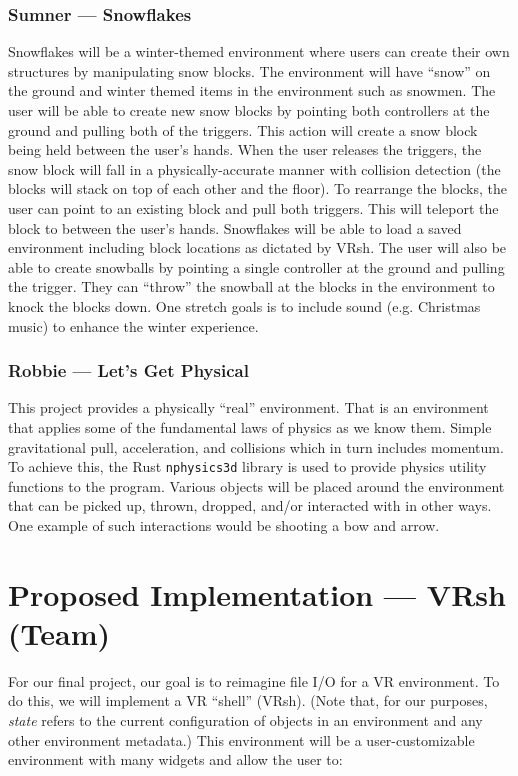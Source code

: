 \documentclass[titlepage,12pt]{article}
\begin{document}
\subsubsection{Sumner --- Snowflakes}
Snowflakes will be a winter-themed environment where users can create their own
structures by manipulating snow blocks. The environment will have ``snow'' on
the ground and winter themed items in the environment such as snowmen. The user
will be able to create new snow blocks by pointing both controllers at the
ground and pulling both of the triggers. This action will create a snow block
being held between the user's hands. When the user releases the triggers, the
snow block will fall in a physically-accurate manner with collision detection
(the blocks will stack on top of each other and the floor). To rearrange the
blocks, the user can point to an existing block and pull both triggers. This
will teleport the block to between the user's hands. Snowflakes will be able to
load a saved environment including block locations as dictated by VRsh. The user
will also be able to create snowballs by pointing a single controller at the
ground and pulling the trigger. They can ``throw'' the snowball at the blocks in
the environment to knock the blocks down. One stretch goals is to include sound
(e.g. Christmas music) to enhance the winter experience.

\subsubsection{Robbie --- Let's Get Physical}
This project provides a physically ``real'' environment.  That is an environment
that applies some of the fundamental laws of physics as we know them. Simple
gravitational pull, acceleration, and collisions which in turn includes
momentum. To achieve this, the Rust \texttt{nphysics3d} library is used to
provide physics utility functions to the program.  Various objects will be
placed around the environment that can be picked up, thrown, dropped, and/or
interacted with in other ways. One example of such interactions would be
shooting a bow and arrow.

\section{Proposed Implementation --- VRsh (Team)}
For our final project, our goal is to reimagine file I/O for a VR environment.
To do this, we will implement a VR ``shell'' (VRsh). (Note that, for our
purposes, \textit{state} refers to the current configuration of objects in an
environment and any other environment metadata.) This environment will be a
user-customizable environment with many widgets and allow the user to:
\end{document}
